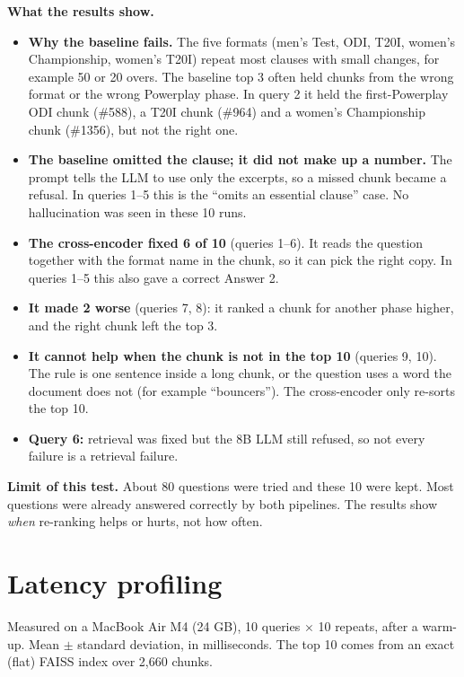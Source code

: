 \documentclass[10pt,a4paper]{article}
\begin{document}
\newpage
\textbf{What the results show.}
\begin{itemize}
\item \textbf{Why the baseline fails.} The five formats (men's Test, ODI, T20I, women's Championship, women's T20I) repeat most clauses with small changes, for example 50 or 20 overs. The baseline top 3 often held chunks from the wrong format or the wrong Powerplay phase. In query 2 it held the first-Powerplay ODI chunk (\#588), a T20I chunk (\#964) and a women's Championship chunk (\#1356), but not the right one.
\item \textbf{The baseline omitted the clause; it did not make up a number.} The prompt tells the LLM to use only the excerpts, so a missed chunk became a refusal. In queries 1--5 this is the ``omits an essential clause'' case. No hallucination was seen in these 10 runs.
\item \textbf{The cross-encoder fixed 6 of 10} (queries 1--6). It reads the question together with the format name in the chunk, so it can pick the right copy. In queries 1--5 this also gave a correct Answer 2.
\item \textbf{It made 2 worse} (queries 7, 8): it ranked a chunk for another phase higher, and the right chunk left the top 3.
\item \textbf{It cannot help when the chunk is not in the top 10} (queries 9, 10). The rule is one sentence inside a long chunk, or the question uses a word the document does not (for example ``bouncers''). The cross-encoder only re-sorts the top 10.
\item \textbf{Query 6:} retrieval was fixed but the 8B LLM still refused, so not every failure is a retrieval failure.
\end{itemize}

\textbf{Limit of this test.} About 80 questions were tried and these 10 were kept. Most questions were already answered correctly by both pipelines. The results show \emph{when} re-ranking helps or hurts, not how often.

\section{Latency profiling}

Measured on a MacBook Air M4 (24 GB), 10 queries $\times$ 10 repeats, after a warm-up. Mean $\pm$ standard deviation, in milliseconds. The top 10 comes from an exact (flat) FAISS index over 2,660 chunks.
\end{document}

